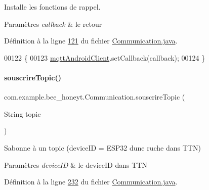 Installe les fonctions de rappel. 


\begin{DoxyParams}{Paramètres}
{\em callback} & le retour \\
\hline
\end{DoxyParams}


Définition à la ligne \hyperlink{_communication_8java_source_l00121}{121} du fichier \hyperlink{_communication_8java_source}{Communication.\+java}.


\begin{DoxyCode}
00122     \{
00123         \hyperlink{classcom_1_1example_1_1bee__honeyt_1_1_communication_a86db63a356e4638c1d39c54bbe64f0e1}{mqttAndroidClient}.setCallback(callback);
00124     \}
\end{DoxyCode}
\mbox{\label{classcom_1_1example_1_1bee__honeyt_1_1_communication_aa1093a3d4f3479595a36ef2425f3ef70}} 
\paragraph{\texorpdfstring{souscrire\+Topic()}{souscrireTopic()}}
{\footnotesize\ttfamily com.\+example.\+bee\+\_\+honeyt.\+Communication.\+souscrire\+Topic (\begin{DoxyParamCaption}\item[{String}]{topic }\end{DoxyParamCaption})\hspace{0.3cm}{\ttfamily [static]}}



S\textquotesingle{}abonne à un topic (device\+ID = E\+S\+P32 d\textquotesingle{}une ruche dans T\+TN) 


\begin{DoxyParams}{Paramètres}
{\em device\+ID} & le device\+ID dans T\+TN \\
\hline
\end{DoxyParams}


Définition à la ligne \hyperlink{_communication_8java_source_l00232}{232} du fichier \hyperlink{_communication_8java_source}{Communication.\+java}.




